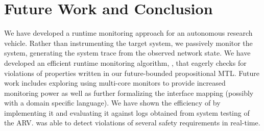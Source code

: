 
\section{Future Work and Conclusion}
We have developed a runtime monitoring approach for an autonomous research vehicle. 
Rather than instrumenting the target system, we passively monitor the system, generating the system trace from the observed network state.
We have developed an efficient runtime monitoring algorithm, \monitor, that eagerly checks for violations of properties written in our future-bounded propositional MTL. 
Future work includes exploring using multi-core monitors to provide increased monitoring power as well as further formalizing the interface mapping (possibly with a domain specific language).
We have shown the efficiency of \monitor by implementing it and evaluating it against logs obtained from system testing of the ARV. 
\monitor was able to detect violations of several safety requirements in real-time.
